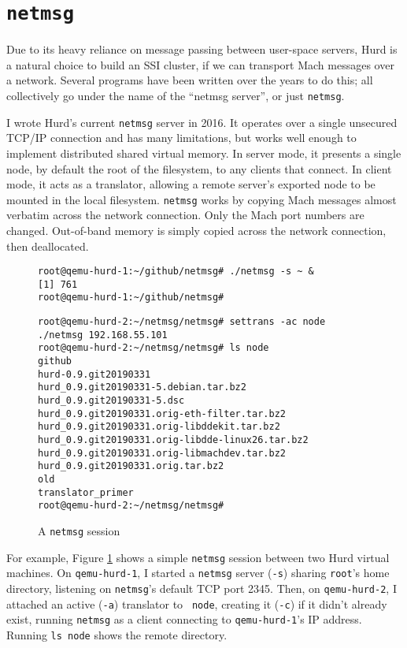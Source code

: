 \documentclass{article}
\def\netmsg{{\tt netmsg}\xspace}
\begin{document}
\section{\netmsg}

Due to its heavy reliance on message passing between user-space
servers, Hurd is a natural choice to build an SSI cluster, if we can
transport Mach messages over a network.  Several programs have been
written over the years to do this; all collectively go under the
name of the ``netmsg server'', or just \netmsg.

I wrote Hurd's current \netmsg server in 2016.  It operates over a
single unsecured TCP/IP connection and has many limitations, but works
well enough to implement distributed shared virtual memory.  In server
mode, it presents a single node, by default the root of the
filesystem, to any clients that connect.  In client mode, it acts as a
translator, allowing a remote server's exported node to be mounted in
the local filesystem.
\netmsg works by copying Mach messages almost verbatim across the
network connection.  Only the Mach port numbers are changed.
Out-of-band memory is simply copied across the network connection,
then deallocated.


\begin{figure}[h]
\begin{mdframed}
\begin{verbatim}
root@qemu-hurd-1:~/github/netmsg# ./netmsg -s ~ &
[1] 761
root@qemu-hurd-1:~/github/netmsg# 
\end{verbatim}
\end{mdframed}

\begin{mdframed}
\begin{verbatim}
root@qemu-hurd-2:~/netmsg/netmsg# settrans -ac node ./netmsg 192.168.55.101
root@qemu-hurd-2:~/netmsg/netmsg# ls node
github
hurd-0.9.git20190331
hurd_0.9.git20190331-5.debian.tar.bz2
hurd_0.9.git20190331-5.dsc
hurd_0.9.git20190331.orig-eth-filter.tar.bz2
hurd_0.9.git20190331.orig-libddekit.tar.bz2
hurd_0.9.git20190331.orig-libdde-linux26.tar.bz2
hurd_0.9.git20190331.orig-libmachdev.tar.bz2
hurd_0.9.git20190331.orig.tar.bz2
old
translator_primer
root@qemu-hurd-2:~/netmsg/netmsg# 
\end{verbatim}
\end{mdframed}
\caption{A \netmsg session}
\label{A netmsg session}
\end{figure}

For example, Figure \ref{A netmsg session} shows a simple \netmsg
session between two Hurd virtual machines.  On {\tt qemu-hurd-1}, I
started a \netmsg server ({\tt -s}) sharing {\tt root}'s home
directory, listening on \netmsg's default TCP port 2345.  Then, on
{\tt qemu-hurd-2}, I attached an active ({\tt -a}) translator to {\tt
  node}, creating it ({\tt -c}) if it didn't already exist, running
\netmsg as a client connecting to {\tt qemu-hurd-1}'s IP address.
Running {\tt ls node} shows the remote directory.
\end{document}

